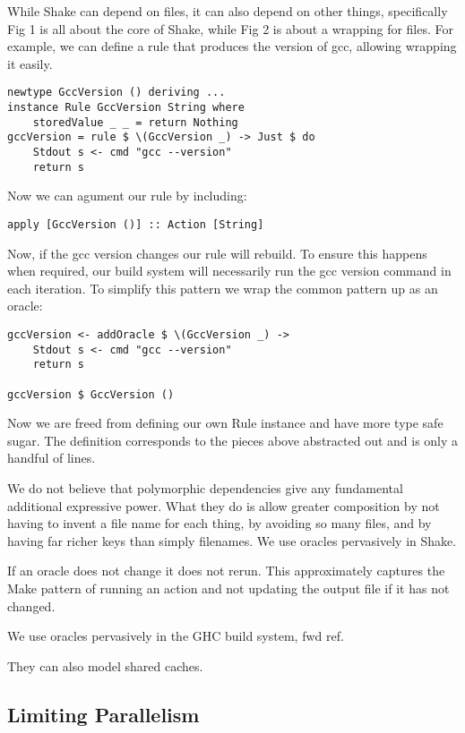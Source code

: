 While Shake can depend on files, it can also depend on other things, specifically Fig 1 is all about the core of Shake, while Fig 2 is about a wrapping for files. For example, we can define a rule that produces the version of gcc, allowing wrapping it easily.

\begin{lstlisting}
newtype GccVersion () deriving ...
instance Rule GccVersion String where
    storedValue _ _ = return Nothing
gccVersion = rule $ \(GccVersion _) -> Just $ do
    Stdout s <- cmd "gcc --version"
    return s
\end{lstlisting}

Now we can agument our rule by including:

\begin{lstlisting}
apply [GccVersion ()] :: Action [String]
\end{lstlisting}

Now, if the gcc version changes our rule will rebuild. To ensure this happens when required, our build system will necessarily run the gcc version command in each iteration. To simplify this pattern we wrap the common pattern up as an oracle:

\begin{lstlisting}
gccVersion <- addOracle $ \(GccVersion _) ->
    Stdout s <- cmd "gcc --version"
    return s

gccVersion $ GccVersion ()
\end{lstlisting}

Now we are freed from defining our own Rule instance and have more type safe sugar. The definition corresponds to the pieces above abstracted out and is only a handful of lines.

We do not believe that polymorphic dependencies give any fundamental additional expressive power. What they do is allow greater composition by not having to invent a file name for each thing, by avoiding so many files, and by having far richer keys than simply filenames. We use oracles pervasively in Shake.

If an oracle does not change it does not rerun. This approximately captures the Make pattern of running an action and not updating the output file if it has not changed.

We use oracles pervasively in the GHC build system, fwd ref.

They can also model shared caches.

\subsection{Limiting Parallelism}

